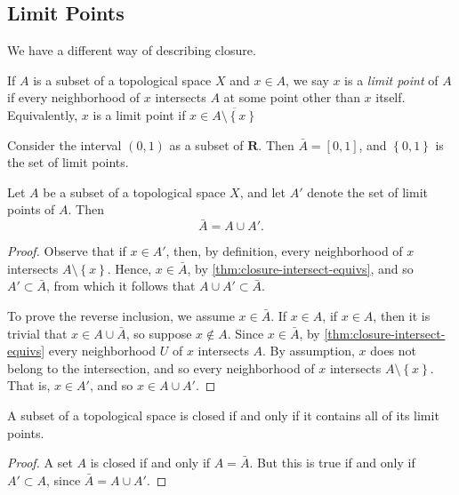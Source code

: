 \subsection{Limit Points}
We have a different way of describing closure.
\begin{definition}
If $A$ is a subset of a topological space $X$ and $x \in A$, we say $x$
is a \emph{limit point} of $A$ if every neighborhood of $x$ intersects
$A$ at some point other than $x$ itself. Equivalently,
$x$ is a limit point if $x \in \overline{A \setminus \left\{ x \right\}}$
\end{definition}
\begin{example}
Consider the interval \((0,1)\) as a subset of \(\mathbf{R}\). Then \(\bar{A} =
[0,1]\), and \(\left\{ 0,1 \right\}\) is the set of limit points.
\end{example}
\begin{theorem}
\label{thm:limit-points-def-closedness}
Let \(A\) be a subset of a topological space \(X\), and let \(A'\) denote the
set of limit points of \(A\). Then
\begin{equation*}
\bar{A} = A \cup A'.
\end{equation*}
\begin{proof}
Observe that if \(x \in A'\), then, by definition, every neighborhood of
\(x\) intersects \(A\setminus \left\{ x \right\}\). Hence, \(x \in
\bar{A}\), by \cref{thm:closure-intersect-equivs}, and so
\(A' \subset \bar{A}\), from which it follows that \(A \cup A' \subset
\bar{A}\).
\par
To prove the reverse inclusion, we assume \(x \in \bar{A}\). If \(x \in A\),
if \(x \in A\), then it is trivial that \(x \in A \cup \bar{A}\), so suppose
\(x \not \in A\). Since \(x \in \bar{A}\), by
\cref{thm:closure-intersect-equivs} every neighborhood \(U\) of \(x\)
intersects \(A\). By assumption, \(x\) does not belong to the intersection,
and so every neighborhood of \(x\) intersects \(A\setminus \left\{ x
\right\} \). That is, \(x \in A'\), and so \(x \in A \cup A'\).
\end{proof}
\end{theorem}
\begin{corollary}
\label{cor:subset-closed-iff-lim-points}
A subset of a topological space is closed if and only if it contains all of
its limit points.
\end{corollary}
\begin{proof}
A set \(A\) is closed if and only if \(A = \bar{A}\). But this is true
if and only if \( A' \subset A\), since \(\bar{A} = A \cup A'\).
\end{proof}
